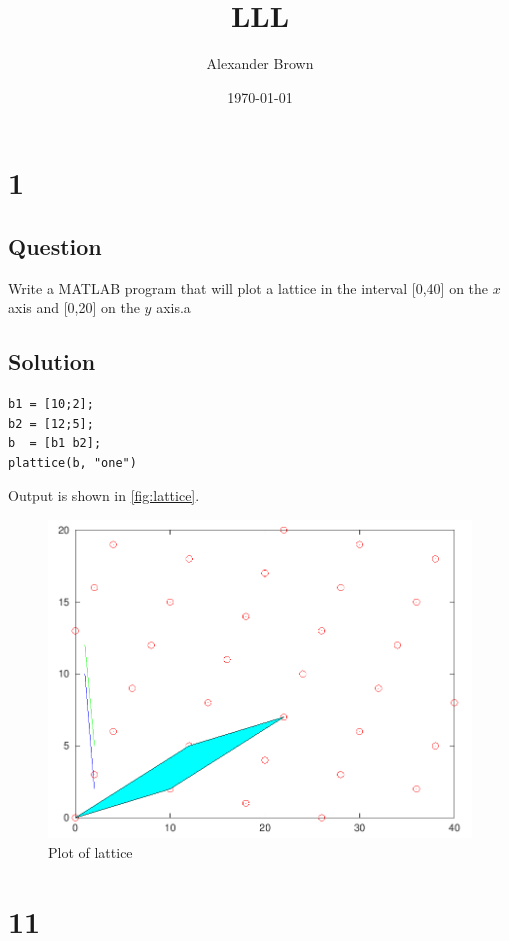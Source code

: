 \documentclass[11pt,a4paper,final]{article}
\author{Alexander Brown}
\date{\today}
\title{LLL}
\begin{document}
\maketitle
\parskip 3mm                                %
\let\ref\autoref                            %

\section{1}
\label{sec:orgdcc62e3}
\subsection{Question}
\label{sec:orga4da0f4}
Write a MATLAB program that will plot a lattice in the interval [0,40] on the \(x\) axis and [0,20] on the \(y\) axis.a

\subsection{Solution}
\label{sec:org520038d}
\begin{verbatim}
b1 = [10;2];
b2 = [12;5];
b  = [b1 b2];
plattice(b, "one")
\end{verbatim}

Output is shown in \ref{fig:lattice}.

\begin{figure}[htbp]
\centering
\includegraphics[width=.9\linewidth]{./one.png}
\caption{\label{fig:lattice}Plot of lattice}
\end{figure}

\pagebreak
\section{11}
\label{sec:org66633c0}
\end{document}
